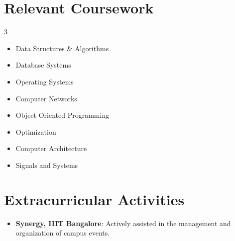 \documentclass[letterpaper,11pt]{article}
\newcommand{\resumeItem}[1]{
  \item\small{
    {#1 \vspace{-2pt}}
  }
}
\newcommand{\resumeSubItem}[1]{\resumeItem{#1}\vspace{-2pt}}
\newcommand{\resumeSubHeadingListStart}{\begin{itemize}[leftmargin=0.0in, label={}]}
\newcommand{\resumeSubHeadingListEnd}{\end{itemize}}
\begin{document}
\section{Relevant Coursework}
    \begin{multicols}{3}
        \begin{itemize}[itemsep=-2pt, parsep=1pt]
            \item\small Data Structures \& Algorithms
            \item\small Database Systems
            \item\small Operating Systems
            \item\small Computer Networks
            \item\small Object-Oriented Programming
            \item\small Optimization
            \item\small Computer Architecture
            \item\small Signals and Systems
        \end{itemize}
    \end{multicols}
    \vspace{-2pt}


\section{Extracurricular Activities}
    \resumeSubHeadingListStart
        \resumeSubItem{\textbf{Synergy, IIIT Bangalore}: Actively assisted in the management and organization of campus events.}
    \resumeSubHeadingListEnd
\end{document}
